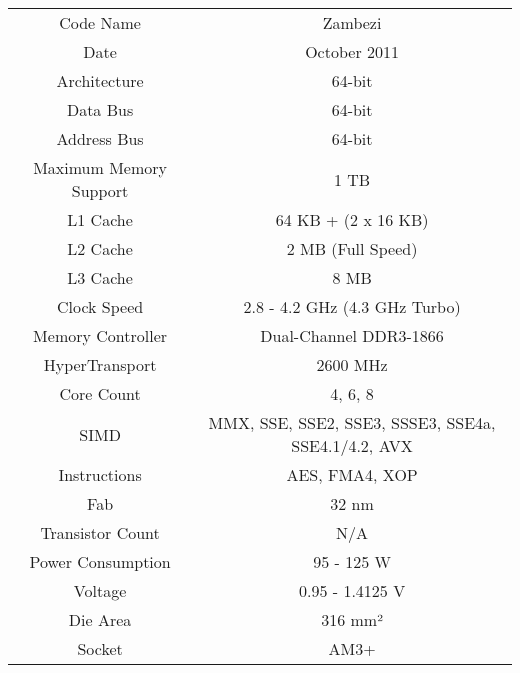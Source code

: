 \documentclass[../computer-history.tex]{subfiles}
\begin{document}
\begin{tabular}{c|c}
    Code Name & Zambezi \\
    Date & October 2011 \\
    Architecture & 64-bit \\
    Data Bus & 64-bit \\
    Address Bus & 64-bit \\
    Maximum Memory Support & 1 TB \\
    L1 Cache & 64 KB + (2 x 16 KB) \\
    L2 Cache & 2 MB (Full Speed) \\
    L3 Cache & 8 MB \\
    Clock Speed & 2.8 - 4.2 GHz (4.3 GHz Turbo) \\
    Memory Controller & Dual-Channel DDR3-1866 \\
    HyperTransport & 2600 MHz \\
    Core Count & 4, 6, 8 \\
    SIMD & MMX, SSE, SSE2, SSE3, SSSE3, SSE4a, SSE4.1/4.2, AVX \\
    Instructions & AES, FMA4, XOP \\
    Fab & 32 nm \\
    Transistor Count & N/A \\
    Power Consumption & 95 - 125 W \\
    Voltage & 0.95 - 1.4125 V \\
    Die Area & 316 mm² \\
    Socket & AM3+
\end{tabular}
\end{document}
